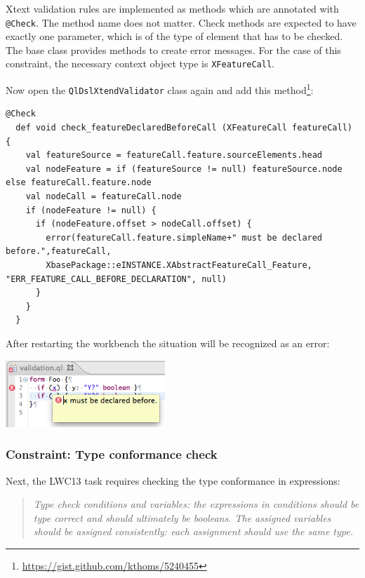Xtext validation rules are implemented as methods which are annotated with
\texttt{@Check}. The method name does not matter. Check methods are expected to
have exactly one parameter, which is of the type of element that has to be
checked. The base class provides methods to create error messages. For the case
of this constraint, the necessary context object type is \texttt{XFeatureCall}. 

Now open the \texttt{QlDslXtendValidator} class again and add this
method\footnote{\url{https://gist.github.com/kthoms/5240455}}:

\begin{lstlisting}[language=Xtend]
  @Check
  def void check_featureDeclaredBeforeCall (XFeatureCall featureCall) {
    val featureSource = featureCall.feature.sourceElements.head
    val nodeFeature = if (featureSource != null) featureSource.node else featureCall.feature.node
    val nodeCall = featureCall.node
    if (nodeFeature != null) {
      if (nodeFeature.offset > nodeCall.offset) {
        error(featureCall.feature.simpleName+" must be declared before.",featureCall, 
        XbasePackage::eINSTANCE.XAbstractFeatureCall_Feature, "ERR_FEATURE_CALL_BEFORE_DECLARATION", null)
      }
    }
  }
\end{lstlisting}

After restarting the workbench the situation will be recognized as an error:

\includegraphics[width=6cm]{images/chapter04/validation_1.png}

\subsubsection{Constraint: Type conformance check}

Next, the LWC13 task requires checking the type conformance in expressions:

\begin{quote}
\emph{Type check conditions and variables: the expressions in conditions should be
type correct and should ultimately be booleans. The assigned variables should be
assigned consistently: each assignment should use the same type.
}\end{quote}

